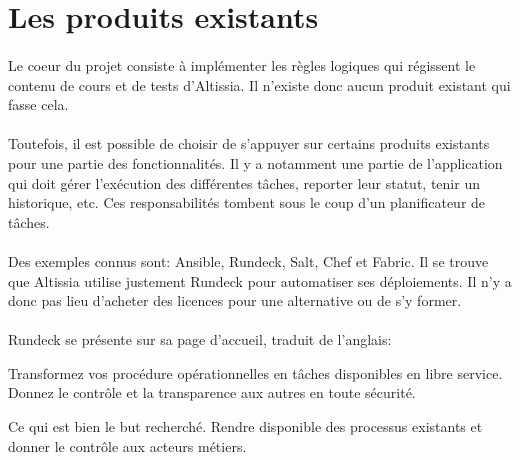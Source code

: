 \section{Les produits existants}
\label{sec:existing-products}

\paragraph{}
Le coeur du projet consiste à implémenter les règles logiques qui régissent le contenu de cours et de tests d'Altissia.
Il n'existe donc aucun produit existant qui fasse cela.

\paragraph{}
Toutefois, il est possible de choisir de s'appuyer sur certains produits existants pour une partie des fonctionnalités.
Il y a notamment une partie de l'application qui doit gérer l'exécution des différentes tâches, reporter leur statut, tenir un historique, etc.
Ces responsabilités tombent sous le coup d'un planificateur de tâches.

\paragraph{}
Des exemples connus sont: Ansible, Rundeck, Salt, Chef et Fabric.
Il se trouve que Altissia utilise justement Rundeck pour automatiser ses déploiements\fnmark.
Il n'y a donc pas lieu d'acheter des licences pour une alternative ou de s'y former.


\paragraph{}
Rundeck se présente sur sa page d'accueil\cite{rundeck_rundeck_nodate}, traduit de l'anglais:
\begin{displayquote}
Transformez vos procédure opérationnelles en tâches disponibles en libre service. Donnez le contrôle et la transparence aux autres en toute sécurité.
\end{displayquote}
Ce qui est bien le but recherché.
Rendre disponible des processus existants et donner le contrôle aux acteurs métiers. 

